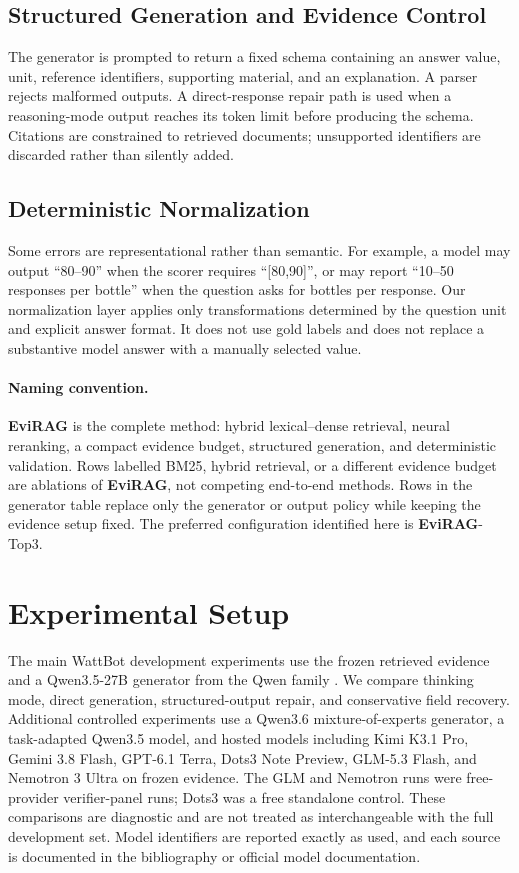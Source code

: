 \documentclass[11pt]{article}
\newcommand{\method}{\textbf{EviRAG}}
\begin{document}
\subsection{Structured Generation and Evidence Control}
The generator is prompted to return a fixed schema containing an answer value, unit, reference identifiers, supporting material, and an explanation. A parser rejects malformed outputs. A direct-response repair path is used when a reasoning-mode output reaches its token limit before producing the schema. Citations are constrained to retrieved documents; unsupported identifiers are discarded rather than silently added.

\subsection{Deterministic Normalization}
Some errors are representational rather than semantic. For example, a model may output ``80--90'' when the scorer requires ``[80,90]'', or may report ``10--50 responses per bottle'' when the question asks for bottles per response. Our normalization layer applies only transformations determined by the question unit and explicit answer format. It does not use gold labels and does not replace a substantive model answer with a manually selected value.

\paragraph{Naming convention.} \method{} is the complete method: hybrid lexical--dense retrieval, neural reranking, a compact evidence budget, structured generation, and deterministic validation. Rows labelled BM25, hybrid retrieval, or a different evidence budget are ablations of \method{}, not competing end-to-end methods. Rows in the generator table replace only the generator or output policy while keeping the evidence setup fixed. The preferred configuration identified here is \method-Top3.

\section{Experimental Setup}
\label{sec:setup}
The main WattBot development experiments use the frozen retrieved evidence and a Qwen3.5-27B generator from the Qwen family \citep{qwen3,qwen3embedding}. We compare thinking mode, direct generation, structured-output repair, and conservative field recovery. Additional controlled experiments use a Qwen3.6 mixture-of-experts generator, a task-adapted Qwen3.5 model, and hosted models including Kimi K3.1 Pro, Gemini 3.8 Flash, GPT-6.1 Terra, Dots3 Note Preview, GLM-5.3 Flash, and Nemotron 3 Ultra on frozen evidence. The GLM and Nemotron runs were free-provider verifier-panel runs; Dots3 was a free standalone control. These comparisons are diagnostic and are not treated as interchangeable with the full development set. Model identifiers are reported exactly as used, and each source is documented in the bibliography or official model documentation.
\end{document}
